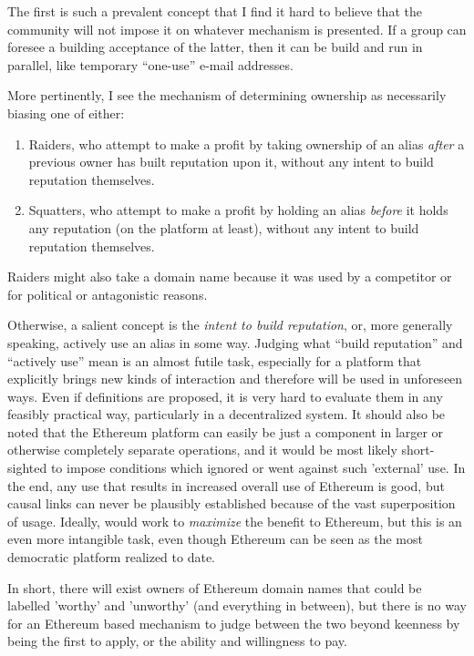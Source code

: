 \documentclass[10pt,a4paper]{article}
\begin{document}
The first is such a prevalent concept that I find it hard to believe that the community will not impose it on whatever mechanism is presented. If a group can foresee a building acceptance of the latter, then it can be build and run in parallel, like temporary ``one-use'' e-mail addresses.

More pertinently, I see the mechanism of determining ownership as necessarily biasing one of either:

\begin{enumerate}
\item Raiders, who attempt to make a profit by taking ownership of an alias {\it after} a previous owner has built reputation upon it, without any intent to build reputation themselves.
\item Squatters, who attempt to make a profit by holding an alias {\it before} it holds any reputation (on the platform at least), without any intent to build reputation themselves. 
\end{enumerate}

Raiders might also take a domain name because it was used by a competitor or for political or antagonistic reasons.
 
Otherwise, a salient concept is the {\it intent to build reputation}, or, more generally speaking, actively use an alias in some way. Judging what ``build reputation'' and ``actively use'' mean is an almost futile task, especially for a platform that explicitly brings new kinds of interaction and therefore will be used in unforeseen ways. Even if definitions are proposed, it is very hard to evaluate them in any feasibly practical way, particularly in a decentralized system. It should also be noted that the Ethereum platform can easily be just a component in larger or otherwise completely separate operations, and it would be most likely short-sighted to impose conditions which ignored or went against such 'external' use. In the end, any use that results in increased overall use of Ethereum is good, but causal links can never be plausibly established because of the vast superposition of usage. Ideally, \ambedon would work to {\it maximize} the benefit to Ethereum, but this is an even more intangible task, even though Ethereum can be seen as the most democratic platform realized to date.

In short, there will exist owners of Ethereum domain names that could be labelled 'worthy' and 'unworthy' (and everything in between), but there is no way for an Ethereum based mechanism to judge between the two beyond keenness by being the first to apply, or the ability and willingness to pay. 
\end{document}
